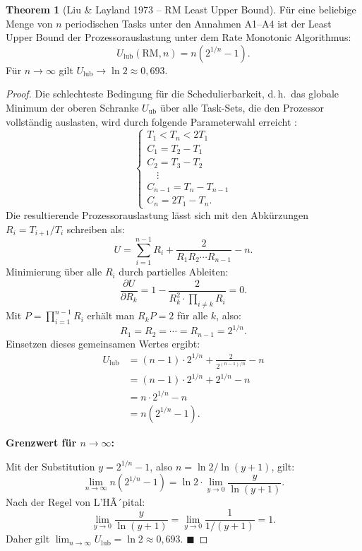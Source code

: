 ﻿\documentclass[a4paper,12pt]{report}
\theoremstyle{definition}
\newtheorem{theorem}{Theorem}[chapter]
\begin{document}
\begin{theorem}[Liu \& Layland 1973 -- RM Least Upper Bound]
	\label{satz:rm_lub}
	Für eine beliebige Menge von $n$ periodischen Tasks unter den Annahmen A1--A4
	ist der Least Upper Bound der Prozessorauslastung unter dem Rate Monotonic
	Algorithmus:
	\[
		U_{\text{lub}}(\text{RM}, n) = n\left(2^{1/n} - 1\right).
	\]
	Für $n \to \infty$ gilt $U_{\text{lub}} \to \ln 2 \approx 0{,}693$.
\end{theorem}

\begin{proof}
	Die schlechteste Bedingung für die Schedulierbarkeit, d.\,h.\ das globale
	Minimum der oberen Schranke $U_{\text{ub}}$ über alle Task-Sets, die den
	Prozessor vollständig auslasten, wird durch folgende Parameterwahl erreicht
	\cite{Liu1973}:
	\begin{equation}
		\begin{cases}
			T_1 < T_n < 2 T_1 \\
			C_1 = T_2 - T_1 \\
			C_2 = T_3 - T_2 \\
			\quad\vdots \\
			C_{n-1} = T_n - T_{n-1} \\
			C_n = 2T_1 - T_n.
		\end{cases}
		\label{eq:worst_case_params}
	\end{equation}
	Die resultierende Prozessorauslastung lässt sich mit den Abkürzungen
	$R_i = T_{i+1}/T_i$ schreiben als:
	\[
		U = \sum_{i=1}^{n-1} R_i + \frac{2}{R_1 R_2 \cdots R_{n-1}} - n.
	\]
	Minimierung über alle $R_i$ durch partielles Ableiten:
	\[
		\frac{\partial U}{\partial R_k} = 1 - \frac{2}{R_k^2 \cdot \prod_{i \neq k} R_i} = 0.
	\]
	Mit $P = \prod_{i=1}^{n-1} R_i$ erhält man $R_k P = 2$ für alle $k$, also:
	\[
		R_1 = R_2 = \cdots = R_{n-1} = 2^{1/n}.
	\]
	Einsetzen dieses gemeinsamen Wertes ergibt:
	\begin{align*}
		U_{\text{lub}}
		&= (n-1) \cdot 2^{1/n} + \frac{2}{2^{(n-1)/n}} - n \\
		&= (n-1) \cdot 2^{1/n} + 2^{1/n} - n \\
		&= n \cdot 2^{1/n} - n \\
		&= n(2^{1/n} - 1).
	\end{align*}

	\textbf{Grenzwert für $n \to \infty$:}

	Mit der Substitution $y = 2^{1/n} - 1$, also $n = \ln 2 / \ln(y+1)$, gilt:
	\[
		\lim_{n \to \infty} n(2^{1/n} - 1) = \ln 2 \cdot \lim_{y \to 0} \frac{y}{\ln(y+1)}.
	\]
	Nach der Regel von L'HÃ´pital:
	\[
		\lim_{y \to 0} \frac{y}{\ln(y+1)} = \lim_{y \to 0} \frac{1}{1/(y+1)} = 1.
	\]
	Daher gilt $\lim_{n\to\infty} U_{\text{lub}} = \ln 2 \approx 0{,}693$. \hfill$\blacksquare$
\end{proof}
\end{document}
